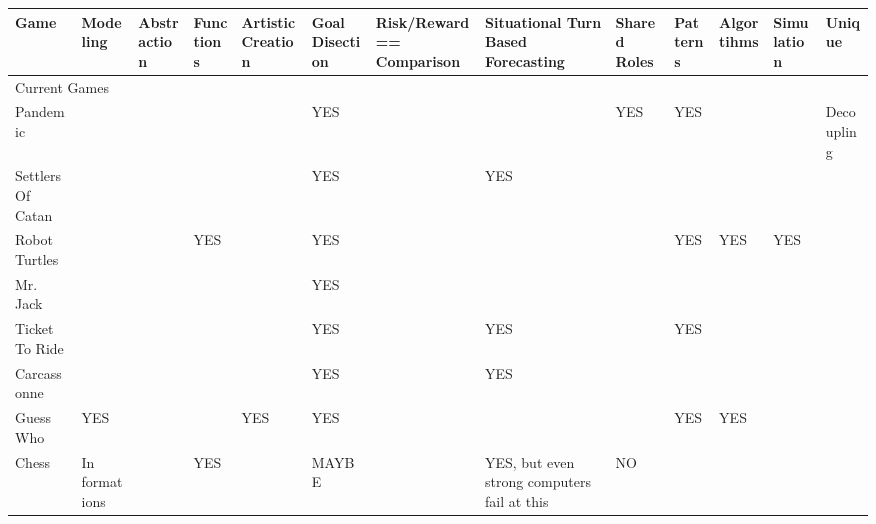 \documentclass{acm_proc_article-sp}
\begin{document}
\clearpage
\begin{sidewaystable}[htbp]
\tiny
    \vspace*{-12cm}\hspace*{-1cm}\begin{tabular}{|p{1.3cm}||p{1cm}|p{2cm}|p{2cm}|p{1.6cm}|p{2cm}|p{1cm}|p{2cm}|p{1cm}|p{1.3cm}|p{2.7cm}|p{1cm}|p{1.6cm}|}
    
    \hline

    Game & Modeling & Abstraction & Functions & Artistic Creation & Goal Disection & Risk/Reward == Comparison & Situational Turn Based Forecasting & Shared Roles & Patterns & Algortihms & Simulation & Unique \\ \hline \hline
    
    \multicolumn{13}{|l|}{Current Games}  \\ \hline \hline
    
    Pandemic & ~ & ~ & ~ & ~ & \cellcolor{blue!25} YES & ~ & ~ & \cellcolor{blue!25}YES & \cellcolor{blue!25}YES & ~ & ~ & Decoupling \\ \hline
    
    Settlers Of Catan & ~ & ~ & ~ & ~ & \cellcolor{blue!25}YES & ~ & \cellcolor{blue!25}YES & ~ & ~ & ~ & ~ & ~ \\ \hline

    Robot Turtles & ~ & ~ & \cellcolor{blue!25}YES & ~ & \cellcolor{blue!25}YES & ~ & ~ & ~ & \cellcolor{blue!25}YES & \cellcolor{blue!25}YES & \cellcolor{blue!25}YES & ~ \\ \hline

    Mr. Jack & ~ & ~ & ~ & ~ & \cellcolor{blue!25}YES & ~ & ~ & ~ & ~ & ~ & ~ & ~ \\ \hline

    Ticket To Ride & ~ & ~ & ~ & ~ & \cellcolor{blue!25}YES & ~ & \cellcolor{blue!25}YES & ~ & \cellcolor{blue!25}YES & ~ & ~ & ~ \\ \hline

    Carcassonne & ~ & ~ & ~ & ~ & \cellcolor{blue!25}YES & ~                                                   & \cellcolor{blue!25}YES & ~ & ~ & ~ & ~ & ~ \\ \hline

    Guess Who & \cellcolor{blue!25}YES & ~ & ~ & \cellcolor{blue!25}YES & \cellcolor{blue!25}YES & ~ & ~ & ~ & \cellcolor{blue!25}YES & \cellcolor{blue!25}YES & ~ & ~ \\ \hline

    Chess & In formations & ~ & \cellcolor{blue!25}YES & ~ & MAYBE & ~ & \cellcolor{blue!25}YES, but even strong computers fail at this & \cellcolor{red!25}NO & ~ & ~ & ~ & ~ \\ \hline


\end{tabular}
\end{sidewaystable}
\end{document}
